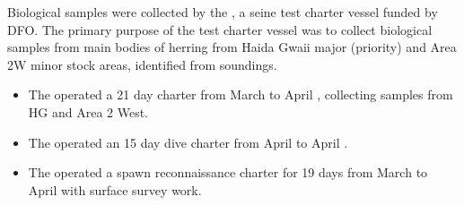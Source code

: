 Biological samples were collected by the ,
a seine test charter vessel funded by DFO.
The primary purpose of the test charter vessel was to
collect biological samples from main bodies of herring from
Haida Gwaii major (priority) and Area 2W minor stock areas,
identified from soundings.

\begin{itemize}

\item The  operated a 21 day charter
from March  to April ,
collecting samples from HG and Area 2 West.

\item The  operated an 15 day dive charter
from April  to April .

\item The  operated a
spawn reconnaissance charter for 19 days
from March  to April  with surface survey work.

\end{itemize}
